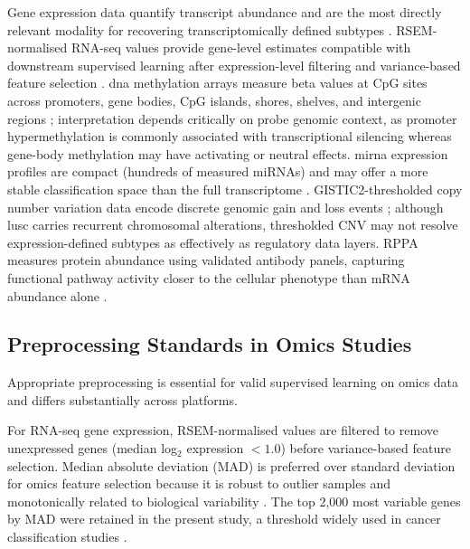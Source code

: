 Gene expression data quantify transcript abundance and are the most directly relevant modality for recovering transcriptomically defined subtypes \parencite{Wilkerson2010}. RSEM-normalised RNA-seq values provide gene-level estimates compatible with downstream supervised learning after expression-level filtering and variance-based feature selection \parencite{Li2013}. \gls{dna} methylation arrays measure beta values at CpG sites across promoters, gene bodies, CpG islands, shores, shelves, and intergenic regions \parencite{Bibikova2011}; interpretation depends critically on probe genomic context, as promoter hypermethylation is commonly associated with transcriptional silencing whereas gene-body methylation may have activating or neutral effects. \gls{mirna} expression profiles are compact (hundreds of measured miRNAs) and may offer a more stable classification space than the full transcriptome \parencite{Wilkerson2010}. GISTIC2-thresholded copy number variation data encode discrete genomic gain and loss events \parencite{Mermel2011}; although \gls{lusc} carries recurrent chromosomal alterations, thresholded CNV may not resolve expression-defined subtypes as effectively as regulatory data layers. RPPA measures protein abundance using validated antibody panels, capturing functional pathway activity closer to the cellular phenotype than mRNA abundance alone \parencite{Tibes2006}.


\subsection{Preprocessing Standards in Omics Studies}


Appropriate preprocessing is essential for valid supervised learning on omics data and differs substantially across platforms.
 
For RNA-seq gene expression, RSEM-normalised values are filtered to remove unexpressed genes (median log$_2$ expression $< 1.0$) before variance-based feature selection. Median absolute deviation (MAD) is preferred over standard deviation for omics feature selection because it is robust to outlier samples and monotonically related to
biological variability \parencite{Hoadley2018}. The top 2{,}000 most variable genes by MAD were retained in the present study, a threshold widely used in cancer classification studies \parencite{Hoadley2018, Picard2021}.
 
